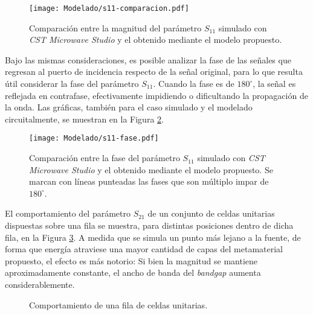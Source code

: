 \begin{figure}[h]
	\centering
	\texttt{[image: Modelado/s11-comparacion.pdf]}
	\caption{Comparación entre la magnitud del parámetro $S_{11}$ simulado con \textit{CST Microwave Studio} y el obtenido mediante el modelo propuesto.}
	\label{fig:s11_comparacion}
\end{figure}


Bajo las mismas consideraciones, es posible analizar la fase de las señales que regresan al puerto de incidencia respecto de la señal original, para lo que resulta útil considerar la fase del parámetro $S_{11}$. Cuando la fase es de $180^{\circ}$, la señal es reflejada en contrafase, efectivamente impidiendo o dificultando la propagación de la onda. Las gráficas, también para el caso simulado y el modelado circuitalmente, se muestran en la Figura \ref{fig:s11-fase-compracion}.

\begin{figure}[h]
	\centering
	\texttt{[image: Modelado/s11-fase.pdf]}
	\caption{Comparación entre la fase del parámetro $S_{11}$ simulado con \textit{CST Microwave Studio} y el obtenido mediante el modelo propuesto. Se marcan con líneas punteadas las fases que son múltiplo impar de $180^{\circ}$.}
	\label{fig:s11-fase-compracion}
\end{figure}

El comportamiento del parámetro $S_{21}$ de un conjunto de celdas unitarias dispuestas sobre una fila se muestra, para distintas posiciones dentro de dicha fila, en la Figura \ref{fig:s12-variacion-pila-super}. A medida que se simula un punto más lejano a la fuente, de forma que energía atraviese una mayor cantidad de capas del metamaterial propuesto, el efecto es más notorio: Si bien la magnitud se mantiene aproximadamente constante, el ancho de banda del \textit{bandgap} aumenta considerablemente.


\begin{figure}[h]
	\centering 
	\hspace{0pt}
	\caption{Comportamiento de una fila de celdas unitarias.}
	\label{fig:s12-variacion-pila-super}	
\end{figure}  

